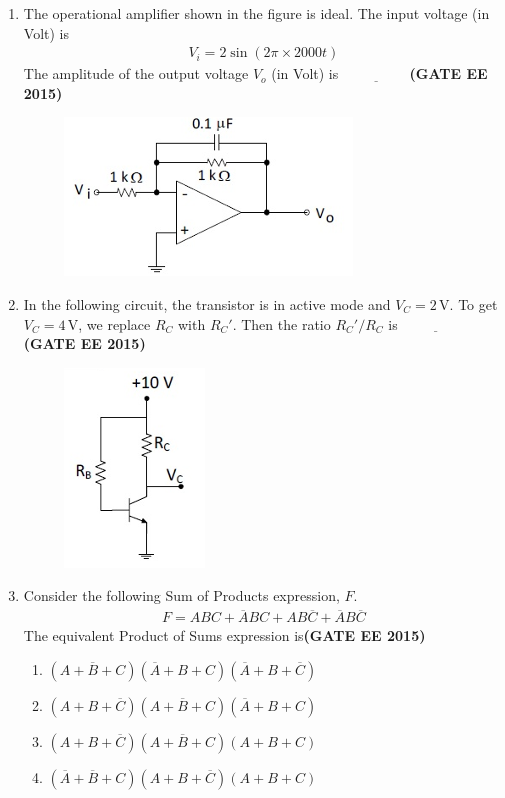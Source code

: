 \documentclass[a4paper,12pt]{exam}
\theoremstyle{remark}
\begin{document}
\begin{enumerate}
\item The operational amplifier shown in the figure is ideal. The input voltage (in Volt) is
\begin{align}
V_{i} = 2\sin(2\pi \times 2000t)
\end{align}
The amplitude of the output voltage $V_o$ (in Volt) is $\underline{\hspace{2cm}}$\hfill{\textbf{(GATE EE 2015)}}
\begin{figure}[H]
    \centering
    \includegraphics[width=0.5\columnwidth]{figs/2Q 21.png}
    \caption{}
    \label{fig:placeholder}
\end{figure}
\item In the following circuit, the transistor is in active mode and $V_C = 2\,\text{V}$. To get $V_C = 4\,\text{V}$, we replace $R_C$ with $R_C'$. Then the ratio $R_C'/R_C$ is $\underline{\hspace{2cm}}$\hfill{\textbf{(GATE EE 2015)}}
\begin{figure}[H]
    \centering
    \includegraphics[width=0.3\columnwidth]{figs/2Q 22.png}
    \caption{}
    \label{fig:placeholder}
\end{figure}
\item Consider the following Sum of Products expression, $F$.
\begin{align}
F = ABC + \overline{A}BC + AB\overline{C} + \overline{A}B\overline{C}
\end{align}
The equivalent Product of Sums expression is\hfill{\textbf{(GATE EE 2015)}}


\begin{enumerate}
    \item $(A + \overline{B} + C)(\overline{A} + B + C)(\overline{A} + B + \overline{C})$
    \item $(A + B + \overline{C})(A + \overline{B} + C)(\overline{A} + B + C)$
    \item $(A + B + \overline{C})(A + \overline{B} + C)(A + B + C)$
    \item $(\overline{A} + \overline{B} + C)(A + B + \overline{C})(A + B + C)$
\end{enumerate}


\end{enumerate}
\end{document}
